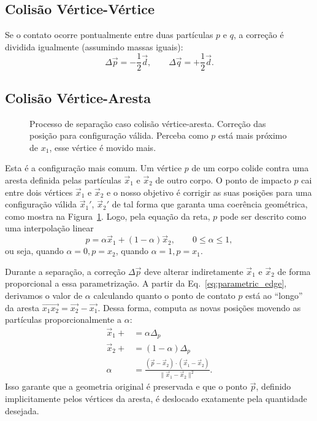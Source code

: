 \subsection*{Colisão Vértice-Vértice}

Se o contato ocorre pontualmente entre duas partículas $p$ e $q$, a correção é dividida igualmente (assumindo massas iguais):
$$
	\Delta \vec p = -\frac{1}{2}\vec d, \qquad
	\Delta \vec q = +\frac{1}{2}\vec d.
$$

\subsection*{Colisão Vértice-Aresta}

\begin{figure}[htb]
	\centering
	
	\caption{Processo de separação caso colisão vértice-aresta. Correção das posição para configuração válida. Perceba como $p$ está mais próximo de $x_1$, esse vértice é movido mais.}
	\label{fig:processo-separacao}
\end{figure}

Esta é a configuração mais comum. Um vértice $p$ de um corpo colide contra uma aresta definida pelas partículas $\vec x_1$ e $\vec x_2$ de outro corpo. O ponto de impacto $p$ cai entre dois vértices $\vec x_1$ e $\vec x_2$ e o nosso objetivo é corrigir as suas posições para uma configuração válida $\vec x_1'$, $\vec x_2'$ de tal forma que garanta uma coerência geométrica, como mostra na Figura~\ref{fig:processo-separacao}. Logo, pela equação da reta, $p$ pode ser descrito como uma interpolação linear
\begin{equation}
	p = \alpha \vec x_1 + (1-\alpha) \vec x_2, \qquad 0 \leq \alpha \leq 1,
	\label{eq:parametric_edge}
\end{equation}
ou seja, quando $\alpha=0, p=x_2$, quando $\alpha=1, p=x_1$.

Durante a separação, a correção $\Delta \vec p$ deve alterar indiretamente $\vec x_1$ e $\vec x_2$ de forma proporcional a essa parametrização. A partir da Eq.~\ref{eq:parametric_edge}, derivamos o valor de $\alpha$ calculando quanto o ponto de contato $p$ está ao ``longo'' da aresta $\vec{x_1 x_2} = \vec{x_2} - \vec{x_1}$. Dessa forma,  computa as novas posições movendo as partículas proporcionalmente a $\alpha$:
\begin{align*}
	\vec x_1 +&= \alpha \Delta_p \\
	\vec x_2 +&= (1-\alpha) \Delta_p \\
	\alpha
	&= 
	\frac{
		(\vec p - \vec x_2) \cdot (\vec x_1 - \vec x_2)
	}{
		\|\vec x_1 - \vec x_2\|^2
	}.
	\label{eq:alpha_projection}
\end{align*}
Isso garante que a geometria original é preservada e que o ponto $\vec p$, definido implicitamente pelos vértices da aresta, é deslocado exatamente pela quantidade desejada.

